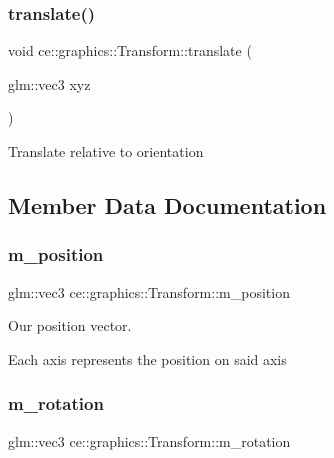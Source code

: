 \subsubsection{\texorpdfstring{translate()}{translate()}\hspace{0.1cm}{\footnotesize\ttfamily [2/2]}}
{\footnotesize\ttfamily void ce\+::graphics\+::\+Transform\+::translate (\begin{DoxyParamCaption}\item[{glm\+::vec3}]{xyz }\end{DoxyParamCaption})}

Translate relative to orientation 

\subsection{Member Data Documentation}
\mbox{\label{classce_1_1graphics_1_1_transform_ac55ab1bffbe1250d4bef77798180d592}} 
\subsubsection{\texorpdfstring{m\+\_\+position}{m\_position}}
{\footnotesize\ttfamily glm\+::vec3 ce\+::graphics\+::\+Transform\+::m\+\_\+position\hspace{0.3cm}{\ttfamily [protected]}}



Our position vector. 

Each axis represents the position on said axis \mbox{\label{classce_1_1graphics_1_1_transform_a1952fc3789a58ab6bb54887bc8374693}} 
\subsubsection{\texorpdfstring{m\+\_\+rotation}{m\_rotation}}
{\footnotesize\ttfamily glm\+::vec3 ce\+::graphics\+::\+Transform\+::m\+\_\+rotation\hspace{0.3cm}{\ttfamily [protected]}}

